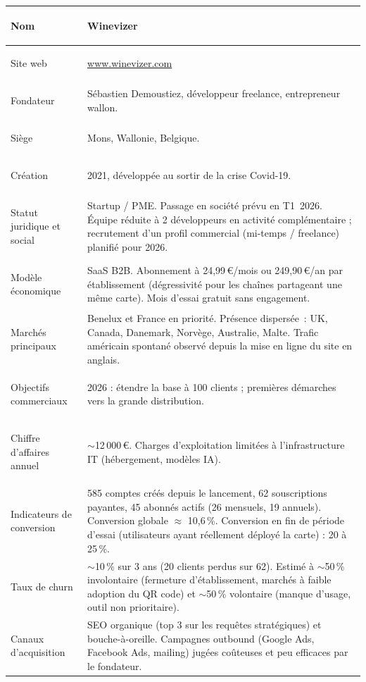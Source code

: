 \documentclass[12pt, a4paper]{article}
\begin{document}
\vspace{0.5em}
\begin{tabularx}{\linewidth}{|>{\bfseries\raggedright\arraybackslash}p{4cm}|Y|}
  \hline
  Nom                              & Winevizer \\ \hline
  Site web                         & \url{www.winevizer.com} \\ \hline
  Fondateur                        & Sébastien Demoustiez, développeur freelance, entrepreneur wallon. \\ \hline
  Siège                            & Mons, Wallonie, Belgique. \\ \hline
  Création                         & 2021, développée au sortir de la crise Covid-19. \\ \hline
  Statut juridique et social       & Startup / PME. Passage en société prévu en T1~2026. Équipe réduite à 2 développeurs en activité complémentaire ; recrutement d'un profil commercial (mi-temps / freelance) planifié pour 2026. \\ \hline
  Modèle économique                & SaaS B2B. Abonnement à 24,99\,€/mois ou 249,90\,€/an par établissement (dégressivité pour les chaînes partageant une même carte). Mois d'essai gratuit sans engagement. \\ \hline
  Marchés principaux               & Benelux et France en priorité. Présence dispersée~: UK, Canada, Danemark, Norvège, Australie, Malte. Trafic américain spontané observé depuis la mise en ligne du site en anglais. \\ \hline
  Objectifs commerciaux            & 2026 : étendre la base à 100 clients ; premières démarches vers la grande distribution. \\ \hline
  Chiffre d'affaires annuel        & $\sim$12\,000\,€. Charges d'exploitation limitées à l'infrastructure IT (hébergement, modèles IA). \\ \hline
  Indicateurs de conversion        & 585 comptes créés depuis le lancement, 62 souscriptions payantes, 45 abonnés actifs (26 mensuels, 19 annuels). Conversion globale $\approx$ 10,6\,\%. Conversion en fin de période d'essai (utilisateurs ayant réellement déployé la carte) : 20 à 25\,\%. \\ \hline
  Taux de churn                    & $\sim$10\,\% sur 3 ans (20 clients perdus sur 62). Estimé à $\sim$50\,\% involontaire (fermeture d'établissement, marchés à faible adoption du QR code) et $\sim$50\,\% volontaire (manque d'usage, outil non prioritaire). \\ \hline
  Canaux d'acquisition             & SEO organique (top 3 sur les requêtes stratégiques) et bouche-à-oreille. Campagnes outbound (Google Ads, Facebook Ads, mailing) jugées coûteuses et peu efficaces par le fondateur. \\ \hline
\end{tabularx}
\end{document}
